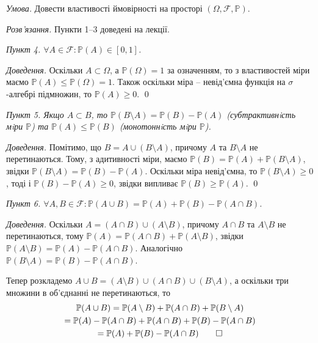 \documentclass[oneside,solution]{karazin-prob-theory-assign}
\begin{document}
\pagebreak
{}

\hspace{20px}\textit{Умова.} Довести властивості ймовірності на просторі $(\Omega,\mathcal{F},\mathbb{P})$.

\textit{Розв'язання.} Пункти 1--3 доведені на лекції.

\vspace{10px}

\textit{Пункт 4. $\forall A \in \mathcal{F}: \mathbb{P}(A) \in [0,1]$.} 

\textit{Доведення.} Оскільки $A \subset \Omega$, а $\mathbb{P}(\Omega)=1$ за означенням, то з властивостей міри маємо $\mathbb{P}(A) \leq \mathbb{P}(\Omega) = 1$. Також оскільки міра -- невід'ємна функція на $\sigma$-алгебрі підмножин, то $\mathbb{P}(A) \geq 0$. \qed

\vspace{10px}
\textit{Пункт 5. Якщо $A \subset B$, то $\mathbb{P}(B \setminus A) = \mathbb{P}(B) - \mathbb{P}(A)$ (субтрактивнiсть мiри $\mathbb{P}$) та $\mathbb{P}(A) \leq \mathbb{P}(B)$ (монотоннiсть мiри $\mathbb{P}$).} 

\textit{Доведення.} Помітимо, що $B = A \cup (B \setminus A)$, причому $A$ та $B \setminus A$ не перетинаються. Тому, з адитивності міри, маємо $\mathbb{P}(B) = \mathbb{P}(A) + \mathbb{P}(B \setminus A)$, звідки $\mathbb{P}(B \setminus A) = \mathbb{P}(B) - \mathbb{P}(A)$. Оскільки міра невід'ємна, то $\mathbb{P}(B \setminus A) \geq 0$, тоді і $\mathbb{P}(B) - \mathbb{P}(A) \geq 0$, звідки випливає $\mathbb{P}(B) \geq \mathbb{P}(A)$. \qed

\vspace{10px}
\textit{Пункт 6. $\forall A,B \in \mathcal{F}: \mathbb{P}(A \cup B) = \mathbb{P}(A) + \mathbb{P}(B) - \mathbb{P}(A \cap B)$.}

\textit{Доведення.} Оскільки $A = (A \cap B) \cup (A \setminus B)$, причому $A \cap B$ та $A \setminus B$ не перетинаються, тому $\mathbb{P}(A) = \mathbb{P}(A \cap B) + \mathbb{P}(A \setminus B)$, звідки $\mathbb{P}(A \setminus B) = \mathbb{P}(A) - \mathbb{P}(A \cap B)$. Аналогічно $\mathbb{P}(B \setminus A) = \mathbb{P}(B) - \mathbb{P}(A \cap B)$.

Тепер розкладемо $A \cup B = (A \setminus B) \cup (A \cap B) \cup (B \setminus A)$, а оскільки три множини в об'єднанні не перетинаються, то
\begin{gather}
    \mathbb{P}(A \cup B) = \mathbb{P}(A \setminus B) + \mathbb{P}(A \cap B) + \mathbb{P}(B \setminus A) \nonumber \\
    = \mathbb{P}(A) - \mathbb{P}(A \cap B) + \mathbb{P}(A \cap B) + \mathbb{P}(B) - \mathbb{P}(A \cap B) \nonumber \\
    = \mathbb{P}(A) + \mathbb{P}(B) - \mathbb{P}(A \cap B)\qed
\end{gather}
\end{document}
